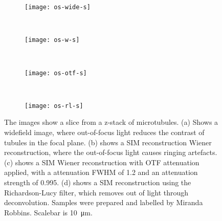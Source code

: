 \begin{figure}[tbp]
\vspace{-6pt} \centering
\begin{subfigure}[b]{0.49\textwidth}
	\texttt{[image: os-wide-s]}
	\caption{}\label{fig:os-wide-s}
\end{subfigure}
~
\begin{subfigure}[b]{0.49\textwidth}
	\texttt{[image: os-w-s]}
	\caption{}\label{fig:os-w-s}
\end{subfigure}
~\newline
\begin{subfigure}[b]{0.49\textwidth}
	\texttt{[image: os-otf-s]}
	\caption{}\label{fig:os-otf-s}
\end{subfigure}
~
\begin{subfigure}[b]{0.49\textwidth}
	\texttt{[image: os-rl-s]}
	\caption{}\label{fig:os-rl-s}
\end{subfigure}
\caption[LAG SIM: Optical sectioning through OTF attenuation removes out-of-focus light]{The images show a slice from a z-stack of microtubules. (a) Shows a widefield image, where out-of-focus light reduces the contrast of tubules in the focal plane. (b) shows a SIM reconstruction Wiener reconstruction, where the out-of-focus light causes ringing artefacts. (c) shows a SIM Wiener reconstruction with OTF attenuation applied, with a attenuation FWHM of 1.2 and an attenuation strength of 0.995. (d) shows a SIM reconstruction using the Richardson-Lucy filter, which removes out of light through deconvolution. Samples were prepared and labelled by Miranda Robbins. Scalebar is \SI{10}{\micro\metre}.}
\label{fig:OS-slice-examples}
\end{figure}

